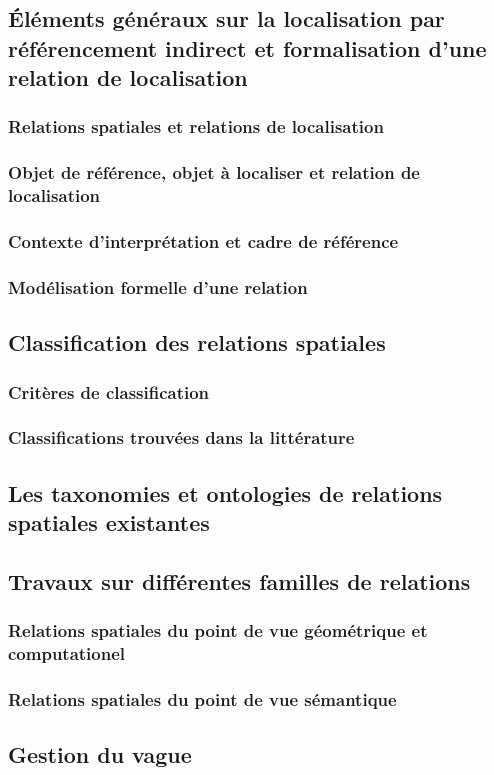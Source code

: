
\subsection{Éléments généraux sur la localisation par référencement
  indirect et formalisation d'une relation de localisation}

\subsubsection{Relations spatiales et relations de localisation}

\subsubsection{Objet de référence, objet à localiser et relation de
  localisation}

\subsubsection{Contexte d'interprétation et cadre de référence}

\subsubsection{Modélisation formelle d'une relation}

\subsection{Classification des relations spatiales}

\subsubsection{Critères de classification}

\subsubsection{Classifications trouvées dans la littérature}

\subsection{Les taxonomies et ontologies de relations spatiales
  existantes}

\subsection{Travaux sur différentes familles de relations}

\subsubsection{Relations spatiales du point de vue géométrique et
  computationel}

\subsubsection{Relations spatiales du point de vue sémantique}

\subsection{Gestion du vague}

